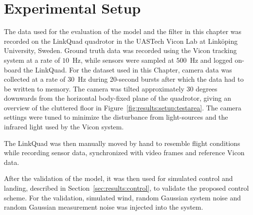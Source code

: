 \section{Experimental Setup}
    The data used for the evaluation of the model and the filter in
    this chapter was recorded on the LinkQuad quadrotor in the UASTech Vicon Lab
    at Linköping University, Sweden. Ground truth data was recorded using
    the Vicon tracking system at a rate of $10$~Hz, while sensors were sampled
    at $500$~Hz and logged on-board the LinkQuad.
    For the dataset used in this Chapter,
    camera data was collected at a rate of $30$~Hz during 20-second bursts after
    which the data had to be written to memory.
    The camera was tilted approximately $30$ degrees downwards from the
    horizontal body-fixed plane of the quadrotor, giving an overview of the cluttered
    floor in Figure~\ref{fig:results:setup:testarea}.
    The camera settings were tuned to minimize the disturbance from light-sources
    and the infrared light used by the Vicon system.

    The LinkQuad was then manually moved by hand to resemble flight conditions
    while recording sensor data, synchronized with video frames and reference Vicon data.


    After the validation of the model, it was then used for simulated
    control and landing, described in Section~\ref{sec:results:control},
    to validate the proposed control scheme.
    For the validation, simulated wind, random Gaussian system noise and
    random Gaussian measurement noise was injected into the system.
